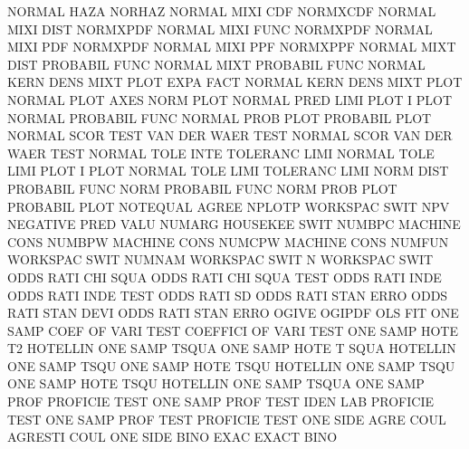 NORMAL   HAZA                           NORHAZ
NORMAL   MIXI CDF                       NORMXCDF
NORMAL   MIXI DIST                      NORMXPDF
NORMAL   MIXI FUNC                      NORMXPDF
NORMAL   MIXI PDF                       NORMXPDF
NORMAL   MIXI PPF                       NORMXPPF
NORMAL   MIXT DIST                      PROBABIL FUNC
NORMAL   MIXT                           PROBABIL FUNC
NORMAL   KERN DENS MIXT PLOT EXPA FACT  NORMAL   KERN DENS MIXT PLOT
NORMAL   PLOT AXES                      NORM     PLOT
NORMAL   PRED LIMI PLOT                 I        PLOT
NORMAL                                  PROBABIL FUNC
NORMAL   PROB PLOT                      PROBABIL PLOT
NORMAL   SCOR TEST                      VAN      DER  WAER TEST
NORMAL   SCOR                           VAN      DER  WAER TEST
NORMAL   TOLE INTE                      TOLERANC LIMI
NORMAL   TOLE LIMI PLOT                 I        PLOT
NORMAL   TOLE LIMI                      TOLERANC LIMI
NORM     DIST                           PROBABIL FUNC
NORM                                    PROBABIL FUNC
NORM     PROB PLOT                      PROBABIL PLOT
NOTEQUAL                                AGREE
NPLOTP                                  WORKSPAC SWIT
NPV                                     NEGATIVE PRED VALU
NUMARG                                  HOUSEKEE SWIT
NUMBPC                                  MACHINE  CONS
NUMBPW                                  MACHINE  CONS
NUMCPW                                  MACHINE  CONS
NUMFUN                                  WORKSPAC SWIT
NUMNAM                                  WORKSPAC SWIT
N                                       WORKSPAC SWIT
ODDS     RATI CHI  SQUA                 ODDS     RATI CHI  SQUA TEST
ODDS     RATI INDE                      ODDS     RATI INDE TEST
ODDS     RATI SD                        ODDS     RATI STAN ERRO
ODDS     RATI STAN DEVI                 ODDS     RATI STAN ERRO
OGIVE                                   OGIPDF
OLS                                     FIT
ONE      SAMP COEF OF   VARI TEST       COEFFICI OF   VARI TEST
ONE      SAMP HOTE T2                   HOTELLIN ONE  SAMP TSQUA
ONE      SAMP HOTE T    SQUA            HOTELLIN ONE  SAMP TSQU
ONE      SAMP HOTE TSQU                 HOTELLIN ONE  SAMP TSQU
ONE      SAMP HOTE TSQU                 HOTELLIN ONE  SAMP TSQUA
ONE      SAMP PROF                      PROFICIE TEST
ONE      SAMP PROF TEST IDEN LAB        PROFICIE TEST
ONE      SAMP PROF TEST                 PROFICIE TEST
ONE      SIDE AGRE COUL                 AGRESTI  COUL
ONE      SIDE BINO EXAC                 EXACT    BINO
